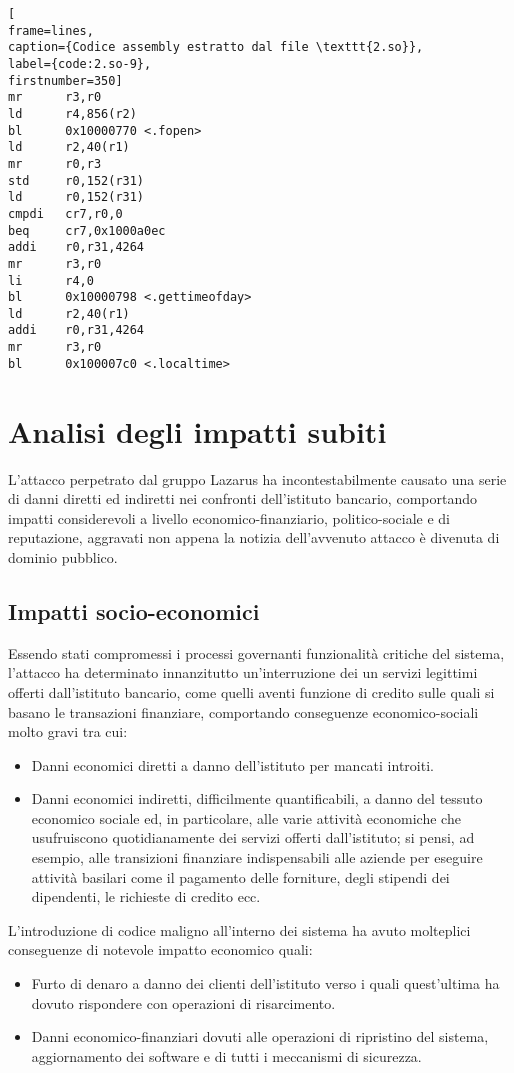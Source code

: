 \documentclass[10pt,a4paper, titlepage]{report}
\begin{document}
\begin{lstlisting}[
frame=lines, 
caption={Codice assembly estratto dal file \texttt{2.so}}, 
label={code:2.so-9},
firstnumber=350]
mr      r3,r0
ld      r4,856(r2)
bl      0x10000770 <.fopen>
ld      r2,40(r1)
mr      r0,r3
std     r0,152(r31)
ld      r0,152(r31)
cmpdi   cr7,r0,0
beq     cr7,0x1000a0ec
addi    r0,r31,4264
mr      r3,r0
li      r4,0
bl      0x10000798 <.gettimeofday>
ld      r2,40(r1)
addi    r0,r31,4264
mr      r3,r0
bl      0x100007c0 <.localtime>
\end{lstlisting}

\newpage
\chapter{Analisi degli impatti subiti}

L'attacco perpetrato dal gruppo Lazarus ha incontestabilmente causato una serie di danni diretti ed indiretti nei confronti dell'istituto bancario, comportando impatti considerevoli a livello economico-finanziario, politico-sociale e di reputazione, aggravati non appena la notizia dell'avvenuto attacco è divenuta di dominio pubblico.

\section{Impatti socio-economici}

Essendo stati compromessi i processi governanti funzionalità critiche del sistema, l'attacco ha determinato innanzitutto un'interruzione dei un servizi legittimi offerti dall'istituto bancario, come quelli aventi funzione di credito sulle quali si basano le transazioni finanziare, comportando conseguenze economico-sociali molto gravi tra cui:
\begin{itemize}
\item Danni economici diretti a danno dell'istituto per mancati introiti.
\item Danni economici indiretti, difficilmente quantificabili, a danno del tessuto economico sociale ed, in particolare, alle varie attività economiche che usufruiscono quotidianamente dei servizi offerti dall'istituto; si pensi, ad esempio, alle transizioni finanziare indispensabili  alle aziende per eseguire attività basilari come il pagamento delle forniture, degli stipendi dei dipendenti, le richieste di credito ecc. 
\end{itemize}

L'introduzione di codice maligno all'interno dei sistema ha avuto molteplici conseguenze di notevole impatto economico quali:
\begin{itemize}
\item Furto di denaro a danno dei clienti dell'istituto verso i quali quest'ultima ha dovuto rispondere con operazioni di risarcimento. 
\item Danni economico-finanziari dovuti alle operazioni di ripristino del sistema, aggiornamento dei software e di tutti i meccanismi di sicurezza.
\end{itemize}
\end{document}
